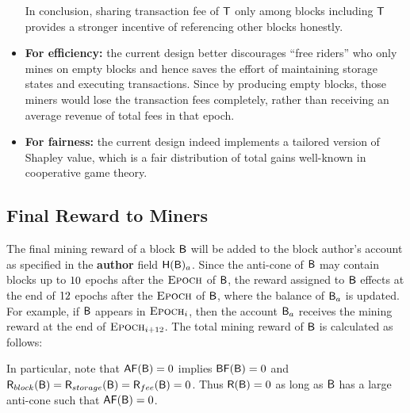 \begin{itemize}
		In conclusion, sharing transaction fee of $\textsf{T}$ only among blocks including $\textsf{T}$ provides a stronger incentive of referencing other blocks honestly.

		\item {\bf For efficiency:} 
		the current design better discourages ``free riders'' who only mines on empty blocks and hence saves the effort of  maintaining storage states and executing transactions.
		Since by producing empty blocks, those miners would lose the transaction fees completely, rather than receiving an average revenue of total fees in that epoch.

		\item {\bf For fairness:}
		the current design indeed implements a tailored version of Shapley value, which is a fair distribution of total gains well-known in cooperative game theory.
	\end{itemize}




\subsection{Final Reward to Miners}

The final mining reward of a block $\textsf{B}$ will be added to the block author's account as specified in the {\bf author} field $\textsf{H}(\textsf{B})_a$.
Since the anti-cone of $\textsf{B}$ may contain blocks up to ${10}$ epochs after the $\textsc{Epoch}$ of $\textsf{B}$,
the reward assigned to $\textsf{B}$ effects at the end of $12$ epochs after the $\textsc{Epoch}$ of $\textsf{B}$, where the balance of $\textsf{B}_a$ is updated.
For example, if $\textsf{B}$ appears in $\textsc{Epoch}_i$, then the account $\textsf{B}_a$ receives the mining reward at the end of $\textsc{Epoch}_{i+12}$. 
The total mining reward of $\textsf{B}$ is calculated as follows:

\oldversion{
	\begin{align}
		\reward(\block)\eqdef \af(\block)\cdot \award(\block)  + \feeaward(\block) = \af(\block)\cdot\basef(\block)\cdot\wf(\block)\cdot\award(\epoch_\block) + \feeaward(\block)
	\end{align}
}
\newversion{
	\begin{align}
	\reward(\block)\eqdef  \award(\block) + \storageaward(\block) + \feeaward(\block) 
\end{align}
}

In particular, note that $\mathsf{AF}(\textsf{B})=0$ implies $\mathsf{BF}(\textsf{B})=0$ and $\textsf{R}_{block}(\textsf{B})=\textsf{R}_{storage}(\textsf{B})=\textsf{R}_{fee}(\textsf{B})=0$.
Thus  
$\textsf{R}(\textsf{B})=0$ as long as $\textsf{B}$ has a large anti-cone such that $\mathsf{AF}(\textsf{B})=0$.






